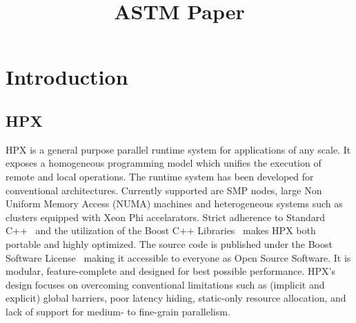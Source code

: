 \documentclass[conference]{IEEEtran}
\begin{document}
\title{ASTM Paper}

\author{
}

\maketitle


\begin{abstract}
\end{abstract}



\IEEEpeerreviewmaketitle


\section{Introduction}

%

\subsection{HPX}

HPX is a general purpose parallel runtime system for applications of any scale.
It exposes a homogeneous programming model which unifies the execution of remote
and local operations. The runtime system has been developed for conventional
architectures. Currently supported are SMP nodes, large Non Uniform Memory Access
(NUMA) machines and heterogeneous systems such as clusters equipped with Xeon Phi
accelarators. Strict adherence to Standard C++~\cite{cxx11_standard} and the
utilization of the Boost C++ Libraries~\cite{boostcpplibraries} makes HPX both
portable and highly optimized.
The source code is published under the Boost Software
License~ making it accessible to everyone as Open Source Software.
It is modular, feature-complete and designed for
best possible performance. HPX's design focuses on overcoming conventional
limitations such as (implicit and explicit) global barriers, poor latency hiding,
static-only resource allocation, and lack of support for medium- to fine-grain
parallelism.
\end{document}

